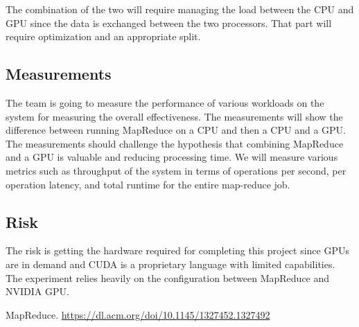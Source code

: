 \documentclass{article}
\begin{document}
The combination of the two will require managing the load between the CPU and GPU since the data is exchanged between the two processors. That part will require optimization and an appropriate split.

\subsection{Measurements}
The team is going to measure the performance of various workloads on the system for measuring the overall effectiveness. The measurements will show the difference between running MapReduce on a CPU and then a CPU and a GPU. The measurements should challenge the hypothesis that combining MapReduce and a GPU is valuable and reducing processing time. We will measure various metrics such as throughput of the system in terms of operations per second, per operation latency, and total runtime for the entire map-reduce job.

\subsection{Risk}
The risk is getting the hardware required for completing this project since GPUs are in demand and CUDA is a proprietary language with limited capabilities. The experiment relies heavily on the configuration between MapReduce and NVIDIA GPU. 

\begin{thebibliography}{}
\raggedright

MapReduce.
\href{https://dl.acm.org/doi/10.1145/1327452.1327492}{https://dl.acm.org/doi/10.1145/1327452.1327492}

\end{thebibliography}
\end{document}
